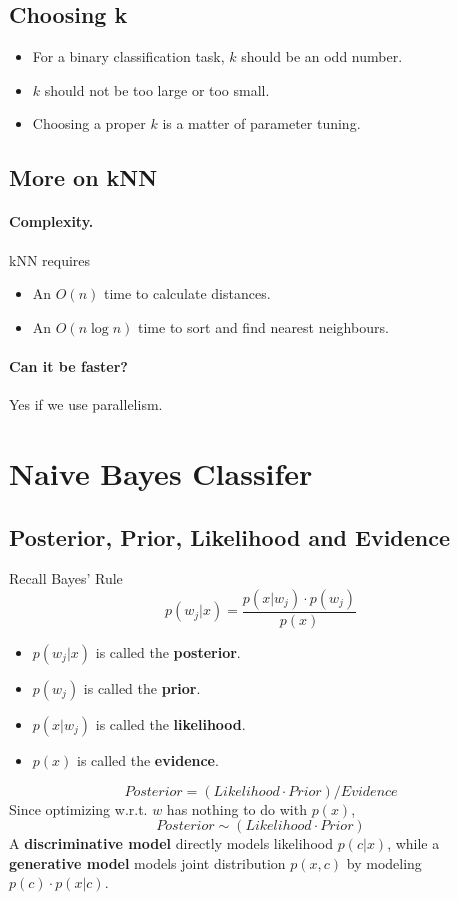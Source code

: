     \subsection{Choosing k}
        \begin{itemize}
            \item For a binary classification task, $k$ should be an odd number.
            \item $k$ should not be too large or too small.
            \item Choosing a proper $k$ is a matter of parameter tuning.
        \end{itemize}

    \subsection{More on kNN}
        \paragraph{Complexity.}
        kNN requires
        \begin{itemize}
            \item An $O(n)$ time to calculate distances.
            \item An $O(n\log n)$ time to sort and find nearest neighbours.
        \end{itemize}
        \paragraph{Can it be faster?}
        Yes if we use parallelism.


\section{Naive Bayes Classifer}

    \subsection{Posterior, Prior, Likelihood and Evidence}
        Recall Bayes' Rule
        \[ p(w_j|x) = \frac{p(x|w_j) \cdot p(w_j)}{p(x)} \]
        \begin{itemize}
            \item $p(w_j|x)$ is called the \textbf{posterior}.
            \item $p(w_j)$ is called the \textbf{prior}.
            \item $p(x|w_j)$ is called the \textbf{likelihood}.
            \item $p(x)$ is called the \textbf{evidence}.
        \end{itemize}
        \[ Posterior = (Likelihood \cdot Prior) / Evidence \]
        Since optimizing w.r.t. $w$ has nothing to do with $p(x)$,
        \[ Posterior \sim (Likelihood \cdot Prior) \]
        A \textbf{discriminative model} directly models likelihood $p(c|x)$, while a \textbf{generative model} models joint distribution $p(x,c)$ by modeling $p(c) \cdot p(x|c)$.

